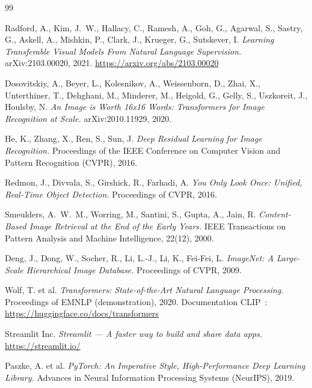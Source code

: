 \documentclass[11pt,a4paper,openany]{report}
\begin{document}
\begin{thebibliography}{99}

Radford, A., Kim, J.~W., Hallacy, C., Ramesh, A., Goh, G., Agarwal, S., Sastry, G., Askell, A., Mishkin, P., Clark, J., Krueger, G., Sutskever, I.
\newblock \emph{Learning Transferable Visual Models From Natural Language Supervision.}
\newblock arXiv:2103.00020, 2021.
\newblock \url{https://arxiv.org/abs/2103.00020}

Dosovitskiy, A., Beyer, L., Kolesnikov, A., Weissenborn, D., Zhai, X., Unterthiner, T., Dehghani, M., Minderer, M., Heigold, G., Gelly, S., Uszkoreit, J., Houlsby, N.
\newblock \emph{An Image is Worth 16x16 Words: Transformers for Image Recognition at Scale.}
\newblock arXiv:2010.11929, 2020.

He, K., Zhang, X., Ren, S., Sun, J.
\newblock \emph{Deep Residual Learning for Image Recognition.}
\newblock Proceedings of the IEEE Conference on Computer Vision and Pattern Recognition (CVPR), 2016.

Redmon, J., Divvala, S., Girshick, R., Farhadi, A.
\newblock \emph{You Only Look Once: Unified, Real-Time Object Detection.}
\newblock Proceedings of CVPR, 2016.

Smeulders, A.~W.~M., Worring, M., Santini, S., Gupta, A., Jain, R.
\newblock \emph{Content-Based Image Retrieval at the End of the Early Years.}
\newblock IEEE Transactions on Pattern Analysis and Machine Intelligence, 22(12), 2000.

Deng, J., Dong, W., Socher, R., Li, L.-J., Li, K., Fei-Fei, L.
\newblock \emph{ImageNet: A Large-Scale Hierarchical Image Database.}
\newblock Proceedings of CVPR, 2009.

Wolf, T. et al.
\newblock \emph{Transformers: State-of-the-Art Natural Language Processing.}
\newblock Proceedings of EMNLP (demonstration), 2020.
\newblock Documentation CLIP~: \url{https://huggingface.co/docs/transformers}

Streamlit Inc.
\newblock \emph{Streamlit — A faster way to build and share data apps.}
\newblock \url{https://streamlit.io/}

Paszke, A. et al.
\newblock \emph{PyTorch: An Imperative Style, High-Performance Deep Learning Library.}
\newblock Advances in Neural Information Processing Systems (NeurIPS), 2019.

\end{thebibliography}
\end{document}
